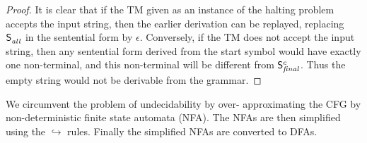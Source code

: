 \documentclass[preprint,9pt]{sigplanconf}
\begin{document}
\begin{proof}
It is clear that if the TM given as an instance of the halting problem
accepts the input string, then the earlier derivation can be replayed,
replacing   $\mathsf{S}_{\mathit{all}}^{}$   in   the  sentential   form   by
$\epsilon$. Conversely,  if the TM  does not accept the  input string,
then  any sentential  form derived  from the  start symbol  would have
exactly one non-terminal, and this non-terminal will be different from
$\mathsf{S}_{\mathit{final}}^{c}$.  Thus  the  empty   string  would  not  be
derivable from the grammar.
\end{proof}


We circumvent  the problem  of undecidability  by over-
approximating the CFG by non-deterministic finite state
automata (NFA). The NFAs  are then simplified using the
$\hookrightarrow$ rules.   Finally the  simplified NFAs
are converted to DFAs.

\end{document}
